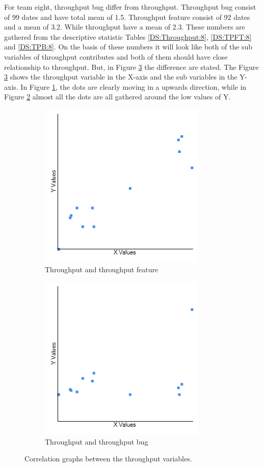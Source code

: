 \documentclass[UKenglish]{ifimaster}  %
\begin{document}
For team eight, throughput bug differ from throughput. Throughput bug consist of 99 dates and have total mean of 1.5. Throughput feature consist of 92 dates and a mean of 3.2. While throughput have a mean of 2.3. These numbers are gathered from the descriptive statistic Tables \ref{DS:Throughput:8}, \ref{DS:TPFT:8} and \ref{DS:TPB:8}.  On the basis of these numbers it will look like both of the sub variables of throughput contributes and both of them should have close relationship to throughput.  But, in Figure \ref{corr:Difference:8} the difference are stated. The Figure \ref{corr:Difference:8} shows the throughput variable in the X-axis and the sub variables in the Y-axis. In Figure \ref{fig:a:8}, the dots are clearly moving in a upwards direction, while in Figure \ref{fig:b:8} almost all the dots are all gathered around the low values of Y.

\begin{figure}[h] 
  \begin{subfigure}[b]{0.5\textwidth}
  \center
\includegraphics[scale=0.5]{Picture/Eight/TPvsTPFT.png}
 \caption{Throughput and throughput feature} 
 \label{fig:a:8}
  \end{subfigure}
  \begin{subfigure}[b]{0.5\textwidth}
  \center
\includegraphics[scale=0.5]{Picture/Eight/TPvsTPB.png}
 \caption{Throughput and throughput bug} 
\label{fig:b:8}
  \end{subfigure}
\caption{Correlation graphs between the throughput variables.}
\label{corr:Difference:8}
\end{figure}
\end{document}
